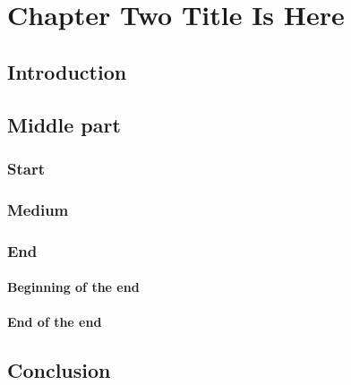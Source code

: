 \chapter[Chapter title]{Chapter Two Title Is Here}

\section{Introduction}
\lipsum[1-3]

\section{Middle part}
\lipsum[10]
\subsection{Start}
\lipsum[1-2]

\lipsum[20-21]
\subsection{Medium}
\lipsum[1-3]
\subsection{End}
\lipsum[11-12]
\subsubsection{Beginning of the end}
\lipsum[14]
\subsubsection{End of the end}
\lipsum[15]

\section{Conclusion}
\lipsum[5-8]